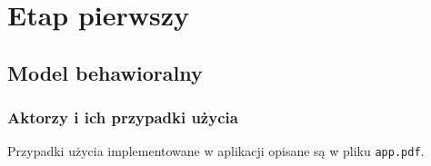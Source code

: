 \documentclass[12pt]{article}
\begin{document}

\section{Etap pierwszy}

\subsection{Model behawioralny}

\subsubsection{Aktorzy i ich przypadki użycia}

\noindent Przypadki użycia implementowane w aplikacji opisane są w pliku \texttt{app.pdf}.
\end{document}
